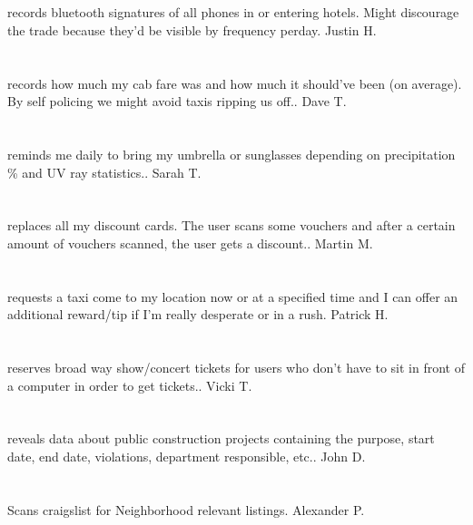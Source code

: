 \section{}records bluetooth signatures of all phones in or entering hotels. Might discourage the trade because they'd be visible by frequency perday. Justin H.
\section{}  records how much my cab fare was and how much it should've been (on average). By self policing we might avoid taxis ripping us off.. Dave T.
\section{}reminds me daily to bring my umbrella or sunglasses depending on precipitation \% and UV ray statistics.. Sarah T.
\section{}replaces all my discount cards. The user scans some vouchers and after a certain amount of vouchers scanned,  the user gets a discount.. Martin M.
\section{}requests a taxi come to my location now or at a specified time and I can offer an additional reward/tip if I'm really desperate or in a rush. Patrick H.
\section{}reserves broad way show/concert tickets for users who don't have to sit in front of a computer in order to get tickets.. Vicki T.
\section{}reveals data about public construction projects containing the purpose,  start date,  end date,  violations,  department responsible,  etc.. John D.
\section{}Scans craigslist for Neighborhood relevant listings. Alexander P.
